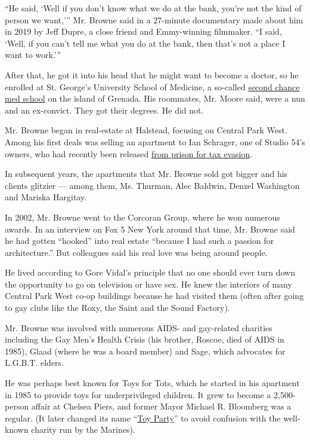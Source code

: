 ``He said, `Well if you don't know what we do at the bank, you're not
the kind of person we want,''' Mr. Browne said in a 27-minute
documentary made about him in 2019 by Jeff Dupre, a close friend and
Emmy-winning filmmaker. ``I said, `Well, if you can't tell me what you
do at the bank, then that's not a place I want to work.'''

After that, he got it into his head that he might want to become a
doctor, so he enrolled at St. George's University School of Medicine, a
so-called
\href{https://www.nytimes3xbfgragh.onion/2014/08/03/education/edlife/second-chance-med-school.html}{second
chance med school} on the island of Grenada. His roommates, Mr. Moore
said, were a nun and an ex-convict. They got their degrees. He did not.

Mr. Browne began in real-estate at Halstead, focusing on Central Park
West. Among his first deals was selling an apartment to Ian Schrager,
one of Studio 54's owners, who had recently been released
\href{https://www.nytimes3xbfgragh.onion/2017/01/18/nyregion/obama-pardons-ian-schrager.html}{from
prison for tax evasion}.

In subsequent years, the apartments that Mr. Browne sold got bigger and
his clients glitzier --- among them, Ms. Thurman, Alec Baldwin, Denzel
Washington and Mariska Hargitay.

In 2002, Mr. Browne went to the Corcoran Group, where he won numerous
awards. In an interview on Fox 5 New York around that time, Mr. Browne
said he had gotten ``hooked'' into real estate ``because I had such a
passion for architecture.'' But colleagues said his real love was being
around people.

He lived according to Gore Vidal's principle that no one should ever
turn down the opportunity to go on television or have sex. He knew the
interiors of many Central Park West co-op buildings because he had
visited them (often after going to gay clubs like the Roxy, the Saint
and the Sound Factory).

Mr. Browne was involved with numerous AIDS- and gay-related charities
including the Gay Men's Health Crisis (his brother, Roscoe, died of AIDS
in 1985), Glaad (where he was a board member) and Sage, which advocates
for L.G.B.T. elders.

He was perhaps best known for Toys for Tots, which he started in his
apartment in 1985 to provide toys for underprivileged children. It grew
to become a 2,500-person affair at Chelsea Piers, and former Mayor
Michael R. Bloomberg was a regular. (It later changed its name
``\href{https://www.nydailynews.com/entertainment/gossip/mayor-bloomberg-shows-playful-side-annual-toy-party-jokes-closets-marriage-equality-article-1.469987}{Toy
Party}'' to avoid confusion with the well-known charity run by the
Marines).

